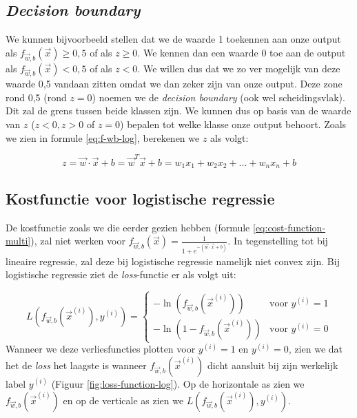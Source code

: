 \subsection{\textit{Decision boundary}}

We kunnen bijvoorbeeld stellen dat we de waarde 1 toekennen aan onze output als $f_{\vec{w},b}(\vec{x}) \geq 0,5$ of als $z \geq 0$. We kennen dan een waarde 0 toe aan de output als $f_{\vec{w},b}(\vec{x}) < 0,5$ of als $z < 0$. We willen dus dat we zo ver mogelijk van deze waarde 0,5 vandaan zitten omdat we dan zeker zijn van onze output. Deze zone rond 0,5 (rond $z = 0$) noemen we de \textit{decision boundary} (ook wel scheidingsvlak). Dit zal de grens tussen beide klassen zijn. We kunnen dus op basis van de waarde van $z$ ($z < 0, z > 0$ of $z = 0$) bepalen tot welke klasse onze output behoort. Zoals we zien in formule \ref{eq:f-wb-log}, berekenen we $z$ als volgt:

\begin{equation}
	z = \vec{w} \cdot \vec{x} + b = \vec{w}^{T}\vec{x} + b = w_{1}x_{1} + w_{2}x_{2} + ... + w_{n}x_{n} + b
\end{equation}

\subsection{Kostfunctie voor logistische regressie}

De kostfunctie zoals we die eerder gezien hebben (formule \ref{eq:cost-function-multi}), zal niet werken voor $f_{\vec{w},b}(\vec{x}) = \frac{1}{1 + e^{-(\vec{w} \cdot \vec{x} + b)}}$. In tegenstelling tot bij lineaire regressie, zal deze bij logistische regressie namelijk niet convex zijn. Bij logistische regressie ziet de \textit{loss}-functie er als volgt uit:

 \begin{equation}
 	L(f_{\vec{w},b}(\vec{x}^{(i)}), y^{(i)}) = \left\{ \begin{matrix} -\ln(f_{\vec{w},b}(\vec{x}^{(i)})) & \mbox{voor } y^{(i)} = 1 \\ -\ln(1 - f_{\vec{w},b}(\vec{x}^{(i)}))  & \mbox{voor } y^{(i)} = 0 \end{matrix}\right .
 	\label{eq:loss-function-log}
 \end{equation}
\noindent
Wanneer we deze verliesfuncties plotten voor $y^{(i)} = 1$ en $y^{(i)} = 0$, zien we dat het de \textit{loss} het laagste is wanneer $f_{\vec{w},b}(\vec{x}^{(i)})$ dicht aansluit bij zijn werkelijk label $y^{(i)}$ (Figuur \ref{fig:loss-function-log}). Op de horizontale as zien we $f_{\vec{w},b}(\vec{x}^{(i)})$ en op de verticale as zien we $L(f_{\vec{w},b}(\vec{x}^{(i)}), y^{(i)})$.

